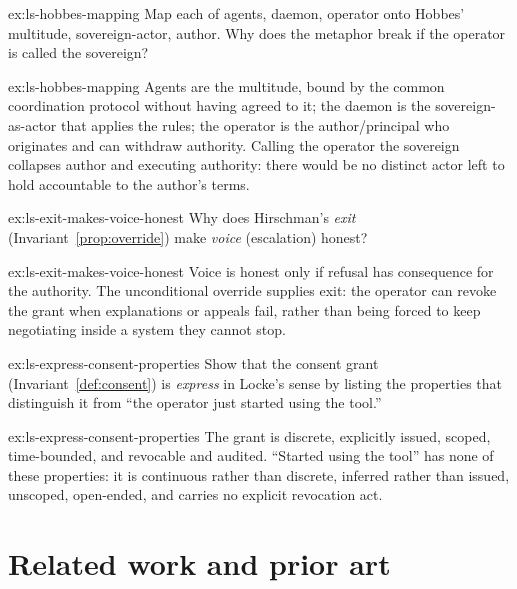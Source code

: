 \documentclass[11pt,a4paper]{article}
\theoremstyle{definition}
\theoremstyle{plain}
\newcounter{protocol}[section]
\begin{document}
\begin{pdexercise}[kind=Check,rating=1]{ex:ls-hobbes-mapping}
Map each of {agents, daemon, operator} onto Hobbes' {multitude, sovereign-actor,
author}. Why does the metaphor break if the operator is called the sovereign?
\end{pdexercise}
\begin{pdsolution}{ex:ls-hobbes-mapping}
Agents are the multitude, bound by the common coordination protocol without having agreed to it; the daemon is the sovereign-as-actor that applies the rules; the operator is the author/principal who originates and can withdraw authority. Calling the operator the sovereign collapses author and executing authority: there would be no distinct actor left to hold accountable to the author's terms.
\end{pdsolution}
\begin{pdexercise}[kind=Check,rating=1]{ex:ls-exit-makes-voice-honest}
Why does Hirschman's \emph{exit} (Invariant~\ref{prop:override}) make \emph{voice}
(escalation) honest?
\end{pdexercise}
\begin{pdsolution}{ex:ls-exit-makes-voice-honest}
Voice is honest only if refusal has consequence for the authority. The unconditional override supplies exit: the operator can revoke the grant when explanations or appeals fail, rather than being forced to keep negotiating inside a system they cannot stop.
\end{pdsolution}
\begin{pdexercise}[kind=Trace,rating=2]{ex:ls-express-consent-properties}
Show that the consent grant (Invariant~\ref{def:consent}) is \emph{express} in
Locke's sense by listing the properties that distinguish it from ``the operator
just started using the tool.''
\end{pdexercise}
\begin{pdsolution}{ex:ls-express-consent-properties}
The grant is discrete, explicitly issued, scoped, time-bounded, and revocable and audited. ``Started using the tool'' has none of these properties: it is continuous rather than discrete, inferred rather than issued, unscoped, open-ended, and carries no explicit revocation act.
\end{pdsolution}


\section{Related work and prior art}\label{sec:related}
\end{document}

